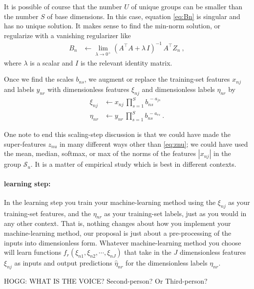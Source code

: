 \documentclass[12pt, letterpaper]{article}
\newcommand{\set}[1]{\mathcal{#1}}
\newcommand{\setS}{\set{S}}
\begin{document}
It is possible of course that the number $U$ of unique groups can be smaller than the number $S$ of base dimensions.
In this case, equation \eqref{eq:Bn} is singular and has no unique solution.
It makes sense to find the min-norm solution, or regularize with a vanishing regularizer like
\begin{align}
    B_n &\leftarrow \lim_{\lambda\rightarrow 0^+} (A^\top A + \lambda\,I)^{-1}\,A^\top Z_n ~,
\end{align}
where $\lambda$ is a scalar and $I$ is the relevant identity matrix.
 
Once we find the scales $b_{ns}$, we augment or replace the training-set features $x_{nj}$ and labels $y_{nr}$ with dimensionless features $\xi_{nj}$ and dimensionless labels $\eta_{nr}$ by
\begin{align}
    \xi_{nj}  &\leftarrow x_{nj}\,\prod_{s=1}^S b_{ns}^{\,-a_{js}} \\
    \eta_{nr} &\leftarrow y_{nr}\,\prod_{s=1}^S b_{ns}^{\,-a_{rs}} ~.
\end{align}

One note to end this scaling-step discussion is that we could have made the super-features $z_{nu}$ in many different ways other than \eqref{eq:znu}; we could have used the mean, median, softmax, or max of the norms of the features $|x_{nj}|$ in the group $\setS_u$.
It is a matter of empirical study which is best in different contexts.

\paragraph{learning step:}
In the learning step you train your machine-learning method using the $\xi_{nj}$ as your training-set features, and the $\eta_{nr}$ as your training-set labels, just as you would in any other context.
That is, nothing changes about how you implement your machine-learning method, our proposal is just about a pre-processing of the inputs into dimensionless form.
Whatever machine-learning method you choose will learn functions $f_r(\xi_{n1}, \xi_{n2}, \cdots, \xi_{nJ})$ that take in the $J$ dimensionless features $\xi_{nj}$ as inputs and output predictions $\hat{\eta}_{nr}$ for the dimensionless labels $\eta_{nr}$.

HOGG: WHAT IS THE VOICE? Second-person? Or Third-person?
\end{document}
